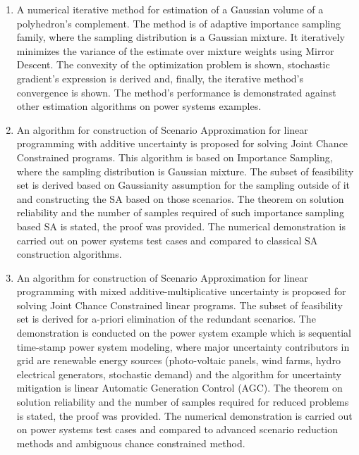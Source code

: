 \begin{enumerate}

    \item A numerical iterative method for estimation of a Gaussian volume of a polyhedron's complement. The method is of adaptive importance sampling family, where the sampling distribution is a Gaussian mixture. It iteratively minimizes the variance of the estimate over mixture weights using Mirror Descent. The convexity of the optimization problem is shown, stochastic gradient's expression is derived and, finally, the iterative method's convergence is shown. The method's performance is demonstrated against other estimation algorithms on power systems examples.
    \item An algorithm for construction of Scenario Approximation for linear programming with additive uncertainty is proposed for solving Joint Chance Constrained programs. This algorithm is based on Importance Sampling, where the sampling distribution is Gaussian mixture. The subset of feasibility set is derived based on Gaussianity assumption for the sampling outside of it and constructing the SA based on those scenarios. The theorem on solution reliability and the number of samples required of such importance sampling based SA is stated, the proof was provided. The numerical demonstration is carried out on power systems test cases and compared to classical SA construction algorithms.
    \item An algorithm for construction of Scenario Approximation for linear programming with mixed additive-multiplicative uncertainty is proposed for solving Joint Chance Constrained linear programs. The subset of feasibility set is derived for a-priori elimination of the redundant scenarios. The demonstration is conducted on the power system example which is sequential time-stamp power system modeling, where major uncertainty contributors in grid are renewable energy sources (photo-voltaic panels, wind farms, hydro electrical generators, stochastic demand) and the algorithm for uncertainty mitigation is linear Automatic Generation Control (AGC).
    The theorem on solution reliability and the number of samples required for reduced problems is stated, the proof was provided. The numerical demonstration is carried out on power systems test cases and compared to advanced scenario reduction methods and ambiguous chance constrained method.
 
\end{enumerate}


